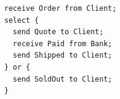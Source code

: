 \begin{lstlisting}[language={}]
receive Order from Client;
select {
  send Quote to Client;
  receive Paid from Bank;
  send Shipped to Client;
} or {
  send SoldOut to Client;
}
\end{lstlisting}
